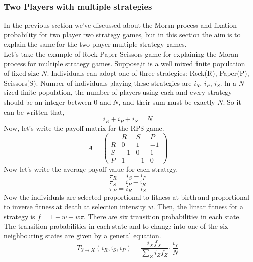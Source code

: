 \documentclass{article}
\begin{document}
\subsubsection{Two Players with multiple strategies}
In the previous section we've discussed about the Moran process and fixation probability for  two player two strategy games,
but in this section the aim is to explain the same for the two player multiple strategy games.\\
Let's take the example of Rock-Paper-Scissors game for explaining the Moran process for multiple strategy games.
Suppose,it is a well mixed finite population of fixed size $N$.
Individuals can adopt one of three strategies: Rock(R), Paper(P), Scissors(S).
Number of individuals playing these strategies are $i_R$, $i_P$, $i_S$.
In a $N$ sized finite population, the number of players using each and every strategy should be an integer between $0$ and $N$, and their sum must be exactly $N$. So it can be written that,
\begin{equation}
i_R+i_P+i_S = N \label{eq:35}
\end{equation}
Now, let's write the payoff matrix for the RPS game.
\begin{equation}
A =
\begin{pmatrix}
  & R & S & P \\
R & 0 & 1 & -1 \\
S & -1 & 0 & 1 \\
P & 1 & -1 & 0
\end{pmatrix} \label{eq:36}
\end{equation}
Now let's write the average payoff value for each strategy.
\begin{equation}
\pi_R= i_S - i_P \label{eq:37}
\end{equation}
\begin{equation}
\pi_S= i_P - i_R \label{eq:38}
\end{equation}
\begin{equation}
\pi_P= i_R - i_S \label{eq:39}
\end{equation}
Now the individuals are selected proportional to fitness at birth and proportional to inverse  fitness at death at selection intensity $w$.
Then, the linear fitness for a strategy is $f=1-w+w\pi$.
There are six transition probabilities in each state.
The transition probabilities in each state and to change into one of the six neighbouring states are given by a general equation.
\begin{equation}
T_{Y \to X}(i_R,i_S,i_P)= \frac{i_X f_X}{\sum_Z i_Z f_Z} \cdot \frac{i_Y}{N} \label{eq:40}
\end{equation}
\end{document}
